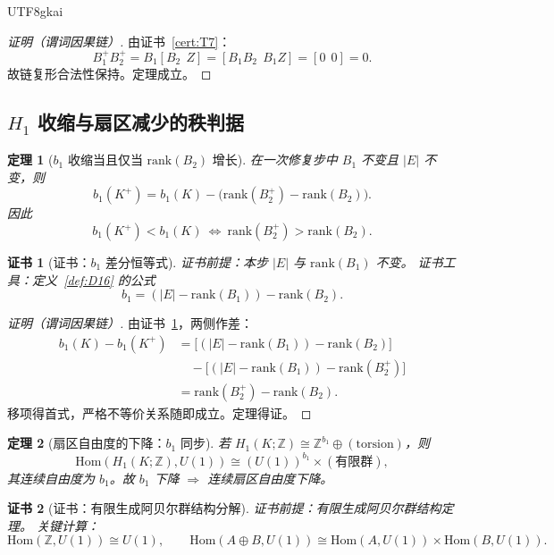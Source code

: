 \documentclass[12pt]{article}
\newtheorem{theorem}{定理}[section]
\newtheorem{Certificate}{证书}[section]
\begin{document}
\begin{CJK*}{UTF8}{gkai}
\begin{proof}[证明（谓词因果链）]
由证书~\ref{cert:T7}：
\[
B_1^+B_2^+=B_1[B_2\ \ Z]=[B_1B_2\ \ B_1Z]=[0\ \ 0]=0.
\]
故链复形合法性保持。定理成立。
\end{proof}

\subsection{$H_1$ 收缩与扇区减少的秩判据}

\begin{theorem}[$b_1$ 收缩当且仅当 $\mathrm{rank}(B_2)$ 增长]
\label{thm:T8}
在一次修复步中 $B_1$ 不变且 $|E|$ 不变，则
\[
b_1(K^+)=b_1(K)-\big(\mathrm{rank}(B_2^+)-\mathrm{rank}(B_2)\big).
\]
因此
\[
b_1(K^+)<b_1(K)\ \Longleftrightarrow\ \mathrm{rank}(B_2^+)>\mathrm{rank}(B_2).
\]
\end{theorem}

\begin{Certificate}[证书：$b_1$ 差分恒等式]
\label{cert:T8}
证书前提：本步 $|E|$ 与 $\mathrm{rank}(B_1)$ 不变。
证书工具：定义~\ref{def:D16} 的公式
\[
b_1=(|E|-\mathrm{rank}(B_1))-\mathrm{rank}(B_2).
\]
\end{Certificate}

\begin{proof}[证明（谓词因果链）]
由证书~\ref{cert:T8}，两侧作差：
\[
\begin{aligned}
b_1(K)-b_1(K^+)
&=\big[(|E|-\mathrm{rank}(B_1))-\mathrm{rank}(B_2)\big]\\
&\quad-\big[(|E|-\mathrm{rank}(B_1))-\mathrm{rank}(B_2^+)\big]\\
&=\mathrm{rank}(B_2^+)-\mathrm{rank}(B_2).
\end{aligned}
\]
移项得首式，严格不等价关系随即成立。定理得证。
\end{proof}

\begin{theorem}[扇区自由度的下降：$b_1$ 同步]
\label{thm:T9}
若 $H_1(K;\mathbb Z)\cong \mathbb Z^{b_1}\oplus(\text{torsion})$，则
\[
\mathrm{Hom}(H_1(K;\mathbb Z),U(1))\cong (U(1))^{b_1}\times(\text{有限群}),
\]
其连续自由度为 $b_1$。故 $b_1$ 下降 $\Rightarrow$ 连续扇区自由度下降。
\end{theorem}

\begin{Certificate}[证书：有限生成阿贝尔群结构分解]
\label{cert:T9}
证书前提：有限生成阿贝尔群结构定理。
关键计算：
\[
\mathrm{Hom}(\mathbb Z,U(1))\cong U(1),
\qquad
\mathrm{Hom}(A\oplus B,U(1))\cong\mathrm{Hom}(A,U(1))\times\mathrm{Hom}(B,U(1)).
\]
\end{Certificate}


\end{CJK*}
\end{document}
